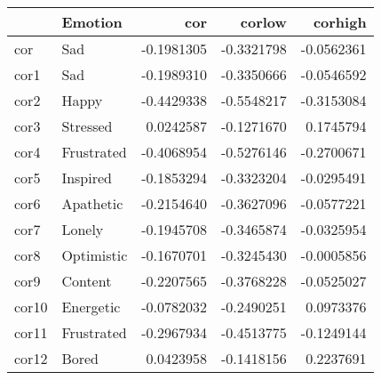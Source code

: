 
\begin{tabular}{l|l|r|r|r}
\hline
  & Emotion & cor & corlow & corhigh\\
\hline
cor & Sad & -0.1981305 & -0.3321798 & -0.0562361\\
\hline
cor1 & Sad & -0.1989310 & -0.3350666 & -0.0546592\\
\hline
cor2 & Happy & -0.4429338 & -0.5548217 & -0.3153084\\
\hline
cor3 & Stressed & 0.0242587 & -0.1271670 & 0.1745794\\
\hline
cor4 & Frustrated & -0.4068954 & -0.5276146 & -0.2700671\\
\hline
cor5 & Inspired & -0.1853294 & -0.3323204 & -0.0295491\\
\hline
cor6 & Apathetic & -0.2154640 & -0.3627096 & -0.0577221\\
\hline
cor7 & Lonely & -0.1945708 & -0.3465874 & -0.0325954\\
\hline
cor8 & Optimistic & -0.1670701 & -0.3245430 & -0.0005856\\
\hline
cor9 & Content & -0.2207565 & -0.3768228 & -0.0525027\\
\hline
cor10 & Energetic & -0.0782032 & -0.2490251 & 0.0973376\\
\hline
cor11 & Frustrated & -0.2967934 & -0.4513775 & -0.1249144\\
\hline
cor12 & Bored & 0.0423958 & -0.1418156 & 0.2237691\\
\hline
\end{tabular}
